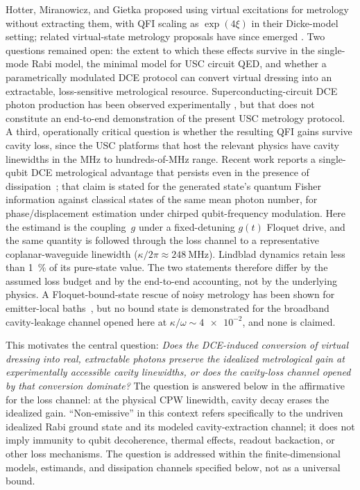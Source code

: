 \documentclass[aps,prxquantum,preprint,superscriptaddress,amsmath,amssymb]{revtex4-2}
\begin{document}
Hotter, Miranowicz, and Gietka \cite{Hotter2025} proposed using virtual excitations for metrology without extracting them, with QFI scaling as $\exp(4\xi)$ in their Dicke-model setting; related virtual-state metrology proposals have since emerged \cite{Lin2025Virtual}. Two questions remained open: the extent to which these effects survive in the single-mode Rabi model, the minimal model for USC circuit QED, and whether a parametrically modulated DCE protocol can convert virtual dressing into an extractable, loss-sensitive metrological resource. Superconducting-circuit DCE photon production has been observed experimentally \cite{Wilson2011}, but that does not constitute an end-to-end demonstration of the present USC metrology protocol. A third, operationally critical question is whether the resulting QFI gains survive cavity loss, since the USC platforms that host the relevant physics have cavity linewidths in the MHz to hundreds-of-MHz range. Recent work reports a single-qubit DCE metrological advantage that persists even in the presence of dissipation~\cite{Schelb2026}; that claim is stated for the generated state's quantum Fisher information against classical states of the same mean photon number, for phase/displacement estimation under chirped qubit-frequency modulation. Here the estimand is the coupling~$g$ under a fixed-detuning $g(t)$ Floquet drive, and the same quantity is followed through the loss channel to a representative coplanar-waveguide linewidth ($\kappa/2\pi \approx \qty{248}{\mega\hertz}$). Lindblad dynamics retain less than \qty{1}{\percent} of its pure-state value. The two statements therefore differ by the assumed loss budget and by the end-to-end accounting, not by the underlying physics. A Floquet-bound-state rescue of noisy metrology has been shown for emitter-local baths~\cite{Bai2023}, but no bound state is demonstrated for the broadband cavity-leakage channel opened here at $\kappa/\omega\sim\num{4e-2}$, and none is claimed.

This motivates the central question: \emph{Does the DCE-induced conversion of virtual dressing into real, extractable photons preserve the idealized metrological gain at experimentally accessible cavity linewidths, or does the cavity-loss channel opened by that conversion dominate?} The question is answered below in the affirmative for the loss channel: at the physical CPW linewidth, cavity decay erases the idealized gain. ``Non-emissive'' in this context refers specifically to the undriven idealized Rabi ground state and its modeled cavity-extraction channel; it does not imply immunity to qubit decoherence, thermal effects, readout backaction, or other loss mechanisms. The question is addressed within the finite-dimensional models, estimands, and dissipation channels specified below, not as a universal bound.
\end{document}
